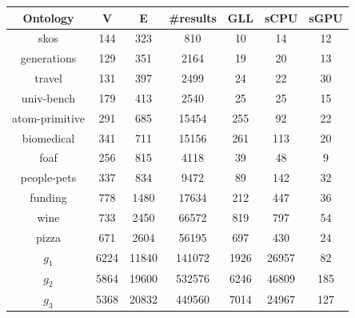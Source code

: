 \documentclass[a0paper,portrait]{baposter}
\begin{document}
\begin{poster}
{\begin{center}
	\begin{tabular}{ | c | c | c | c | c | c | c |}
		\hline
		Ontology & V & E & \#results & GLL & sCPU & sGPU\\
		\hline 
		\hline
		skos        & 144 & 323 & 810 & 10 & 14 & 12\\
		generations & 129 & 351 & 2164 & 19 & 20 & 13\\
		travel      & 131 & 397 & 2499 & 24 & 22 & 30\\
		univ-bench  & 179 & 413 & 2540 & 25 & 25 & 15\\
		atom-primitive & 291 & 685 & 15454 & 255 & 92 & 22\\
		biomedical & 341 & 711 & 15156 & 261 & 113 & 20\\
		foaf        & 256 & 815 & 4118 & 39 & 48 & 9\\
		people-pets & 337 & 834 & 9472 & 89 & 142 & 32\\
		funding     & 778 & 1480 & 17634 & 212 & 447 & 36\\
		wine        & 733 & 2450 & 66572 & 819 & 797 & 54\\
		pizza       & 671 & 2604 & 56195 & 697 & 430 & 24\\
		$g_{1}$     & 6224 & 11840 & 141072 & 1926 & 26957 & 82\\
		$g_{2}$     & 5864 & 19600 & 532576 & 6246 & 46809 & 185\\
		$g_{3}$     & 5368 & 20832 & 449560 & 7014 & 24967 & 127\\
		\hline
	\end{tabular}


\end{center}}
\end{poster}
\end{document}
